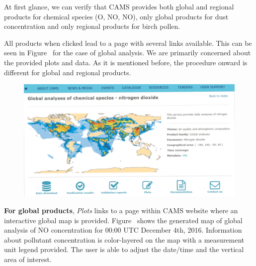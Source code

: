 \documentclass[9pt]{report}
\begin{document}
\noindent{}At first glance, we can verify that CAMS provides both global and regional products for chemical species (O, NO, NO), only global products for dust concentration and only regional products for birch pollen.%

All products when clicked lead to a page with several links available. This can be seen in Figure~ for the case of global analysis.
We are primarily concerned about the provided plots and data.
As it is mentioned before, the procedure onward is different for global and regional products.%

\begin{figure}[h!]%
\begin{mdcenter}%

\noindent{}\includegraphics[keepaspectratio=true,width=\dimmin{}{\dimwidth{0.90}}]{images/catalogue}{}%

\mdhr{}%

\noindent{}%
\end{mdcenter}\label{cams-catalogue}%
\end{figure}%

\noindent{}\textbf{For global products}, \emph{Plots} links to a page within CAMS website where an interactive global map is provided.
Figure~ shows the generated map of global analysis of NO concentration for 00:00 UTC December 4th, 2016.
Information about pollutant concentration is color-layered on the map with a measurement unit legend provided.
The user is able to adjust the date/time and the vertical area of interest.%
\end{document}
